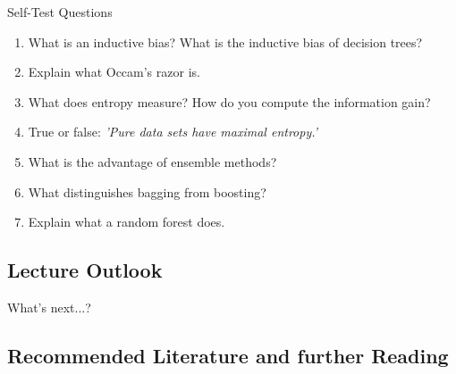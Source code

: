 \begin{frame}{Self-Test Questions}{}\important
	\begin{enumerate}
		\item What is an inductive bias? What is the inductive bias of decision trees?
		\item Explain what Occam's razor is.
		\item What does entropy measure? How do you compute the information gain?
		\item True or false: \textit{'Pure data sets have maximal entropy.'}
		\item What is the advantage of ensemble methods?
		\item What distinguishes bagging from boosting?
		\item Explain what a random forest does.
	\end{enumerate}
\end{frame}


\subsection{Lecture Outlook}

\begin{frame}{What's next...?}{}
\end{frame}


\subsection{Recommended Literature and further Reading}

